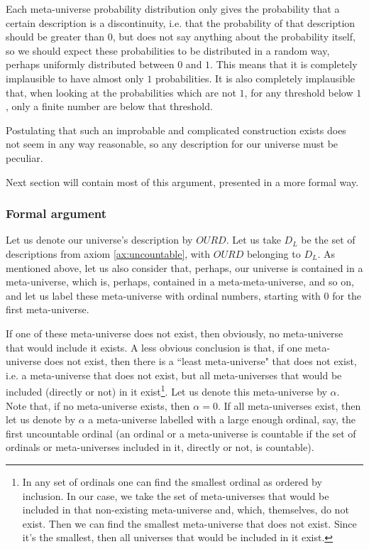 \documentclass[a4paper
]{article}
\def\descriptions{D_L}
\def\our_description{OURD}
\newcommand{\ghilimele}[1]{``#1"}
\begin{document}
Each meta-universe probability distribution only gives the
probability that a certain description is a discontinuity, i.e. that
the probability of that description should be greater than $0$, but does not say
anything about the probability itself,
so we should expect these probabilities to
be distributed in a random way, perhaps uniformly distributed between $0$ and
$1$. This means that it is completely implausible to have almost only $1$
probabilities. It is also completely implausible that, when looking at the
probabilities which are not $1$, for any threshold below $1$, only a finite
number are below that threshold.

Postulating that such an improbable and complicated construction exists does
not seem in any way reasonable,
so any description for our universe must be peculiar.

Next section will contain most of this argument, presented in a more formal way.

\subsubsection{Formal argument}

Let us denote our universe's description by
$\our_description$. Let us take $\descriptions$ be the set of descriptions from
axiom \ref{ax:uncountable}, with $\our_description$ belonging to $\descriptions$.
As mentioned above, let us also consider that, perhaps, our universe is
contained in a meta-universe, which is, perhaps, contained in
a meta-meta-universe, and so on, and let us label these meta-universe
with ordinal numbers, starting with $0$ for the first meta-universe.

If one of these meta-universe does not exist, then obviously, no meta-universe
that would include it exists. A less obvious conclusion is that, if one
meta-universe does not exist, then there is a \ghilimele{least meta-universe}
that does not exist, i.e. a meta-universe that does not exist,
but all meta-universes that would be
included (directly or not) in it exist\footnote{In any set of ordinals
one can find the smallest ordinal as ordered by inclusion.
In our case, we take the set of
meta-universes that would be included in that non-existing meta-universe and,
which, themselves, do not exist. Then we can find the smallest meta-universe
that does not exist. Since it's the smallest, then all universes that would
be included in it exist.}. Let us denote this meta-universe by $\alpha$. Note
that, if no meta-universe exists, then $\alpha=0$. If all
meta-universes exist, then let us denote by $\alpha$ a meta-universe labelled
with a large enough ordinal, say, the first uncountable ordinal
(an ordinal or a meta-universe is countable if the set of ordinals or
meta-universes included in it, directly or not, is countable).
\end{document}
